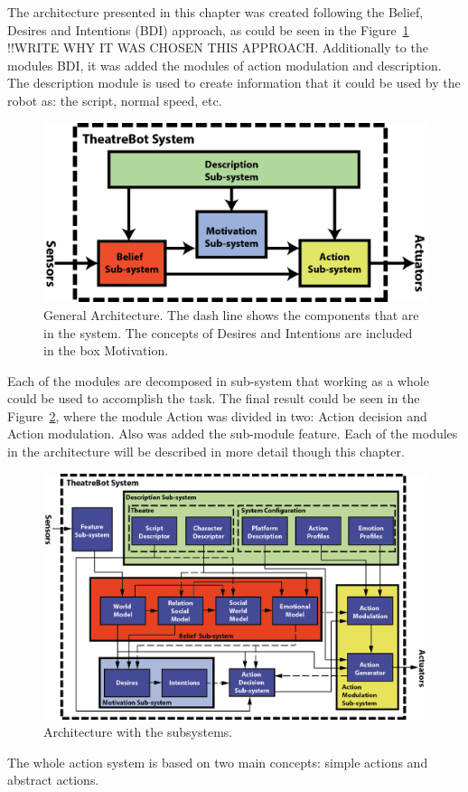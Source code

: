 The architecture presented in this chapter was created following the Belief, Desires and Intentions (BDI) approach, as could be seen in the Figure~\ref{fig:GeneralArchitecture}  !!WRITE WHY IT WAS CHOSEN THIS APPROACH. Additionally to the modules BDI, it was added the modules of action modulation and description. The description module is used to create information that it could be used by the robot as: the script, normal speed, etc.
\begin{figure}
	\centering
	\includegraphics[width=1.0\textwidth]{./Images/Architecture/GeneralArchitecture.png} 
	\caption{General Architecture. The dash line shows the components that are in the system. The concepts of Desires and Intentions are included in the box Motivation.}
	\label{fig:GeneralArchitecture}
\end{figure}
Each of the modules are decomposed in sub-system that working as a whole could be used to accomplish the task. The final result could be seen in the Figure~\ref{fig:ArchitectureWithSubSystems}, where the module Action was divided in two: Action decision and Action modulation. Also was added the sub-module feature. Each of the modules in the architecture will be described in more detail though this chapter. 
\begin{figure}
	\centering
	\includegraphics[width=1.0\textwidth]{./Images/Architecture/ArchitectureNew.png} 
	\caption{Architecture with the subsystems.}
	\label{fig:ArchitectureWithSubSystems}
\end{figure}
The whole action system is based on two main concepts: simple actions and abstract actions.
